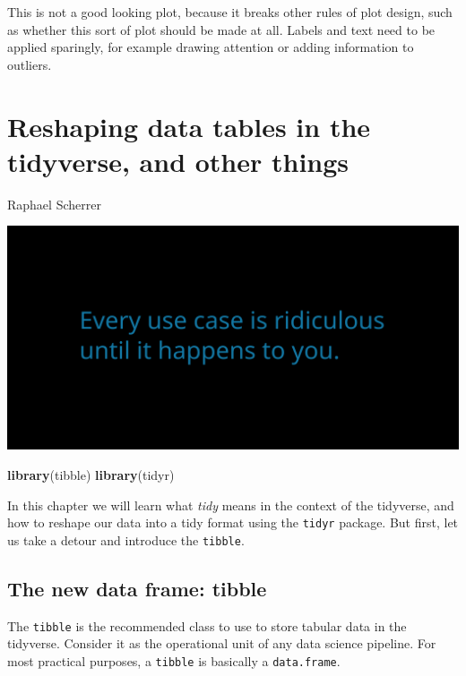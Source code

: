 \documentclass[]{book}
\newenvironment{Shaded}{}{}
\newcommand{\KeywordTok}[1]{\textcolor[rgb]{0.00,0.44,0.13}{\textbf{#1}}}
\newcommand{\NormalTok}[1]{#1}
\begin{document}
This is not a good looking plot, because it breaks other rules of plot design, such as whether this sort of plot should be made at all. Labels and text need to be applied sparingly, for example drawing attention or adding information to outliers.

\hypertarget{reshaping-data-tables-in-the-tidyverse-and-other-things}{%
\chapter{Reshaping data tables in the tidyverse, and other things}\label{reshaping-data-tables-in-the-tidyverse-and-other-things}}

Raphael Scherrer

\includegraphics{opening-image.png}

\begin{Shaded}
\begin{Highlighting}[]
\KeywordTok{library}\NormalTok{(tibble)}
\KeywordTok{library}\NormalTok{(tidyr)}
\end{Highlighting}
\end{Shaded}

In this chapter we will learn what \emph{tidy} means in the context of the tidyverse, and how to reshape our data into a tidy format using the \texttt{tidyr} package. But first, let us take a detour and introduce the \texttt{tibble}.

\hypertarget{the-new-data-frame-tibble}{%
\section{The new data frame: tibble}\label{the-new-data-frame-tibble}}

The \texttt{tibble} is the recommended class to use to store tabular data in the tidyverse. Consider it as the operational unit of any data science pipeline. For most practical purposes, a \texttt{tibble} is basically a \texttt{data.frame}.
\end{document}
